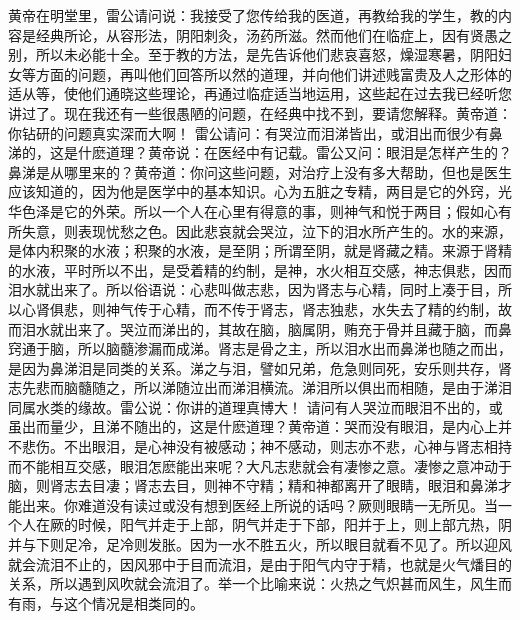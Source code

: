 \documentclass[a4paper,12pt,UTF8,twoside]{ctexbook}
\begin{document}
黄帝在明堂里，雷公请问说：我接受了您传给我的医道，再教给我的学生，教的内容是经典所论，从容形法，阴阳刺灸，汤药所滋。然而他们在临症上，因有贤愚之别，所以未必能十全。至于教的方法，是先告诉他们悲哀喜怒，燥湿寒暑，阴阳妇女等方面的问题，再叫他们回答所以然的道理，并向他们讲述贱富贵及人之形体的适从等，使他们通晓这些理论，再通过临症适当地运用，这些起在过去我已经听您讲过了。现在我还有一些很愚陋的问题，在经典中找不到，要请您解释。黄帝道：你钻研的问题真实深而大啊！
雷公请问：有哭泣而泪涕皆出，或泪出而很少有鼻涕的，这是什麽道理？黄帝说：在医经中有记载。雷公又问：眼泪是怎样产生的？鼻涕是从哪里来的？黄帝道：你问这些问题，对治疗上没有多大帮助，但也是医生应该知道的，因为他是医学中的基本知识。心为五脏之专精，两目是它的外窍，光华色泽是它的外荣。所以一个人在心里有得意的事，则神气和悦于两目；假如心有所失意，则表现忧愁之色。因此悲哀就会哭泣，泣下的泪水所产生的。水的来源，是体内积聚的水液；积聚的水液，是至阴；所谓至阴，就是肾藏之精。来源于肾精的水液，平时所以不出，是受着精的约制，是神，水火相互交感，神志俱悲，因而泪水就出来了。所以俗语说：心悲叫做志悲，因为肾志与心精，同时上凑于目，所以心肾俱悲，则神气传于心精，而不传于肾志，肾志独悲，水失去了精的约制，故而泪水就出来了。哭泣而涕出的，其故在脑，脑属阴，贿充于骨并且藏于脑，而鼻窍通于脑，所以脑髓渗漏而成涕。肾志是骨之主，所以泪水出而鼻涕也随之而出，是因为鼻涕泪是同类的关系。涕之与泪，譬如兄弟，危急则同死，安乐则共存，肾志先悲而脑髓随之，所以涕随泣出而涕泪横流。涕泪所以俱出而相随，是由于涕泪同属水类的缘故。雷公说：你讲的道理真博大！
请问有人哭泣而眼泪不出的，或虽出而量少，且涕不随出的，这是什麽道理？黄帝道：哭而没有眼泪，是内心上并不悲伤。不出眼泪，是心神没有被感动；神不感动，则志亦不悲，心神与肾志相持而不能相互交感，眼泪怎麽能出来呢？大凡志悲就会有凄惨之意。凄惨之意冲动于脑，则肾志去目凄；肾志去目，则神不守精；精和神都离开了眼睛，眼泪和鼻涕才能出来。你难道没有读过或没有想到医经上所说的话吗？厥则眼睛一无所见。当一个人在厥的时候，阳气并走于上部，阴气并走于下部，阳并于上，则上部亢热，阴并与下则足冷，足冷则发胀。因为一水不胜五火，所以眼目就看不见了。所以迎风就会流泪不止的，因风邪中于目而流泪，是由于阳气内守于精，也就是火气燔目的关系，所以遇到风吹就会流泪了。举一个比喻来说：火热之气炽甚而风生，风生而有雨，与这个情况是相类同的。
\end{document}
